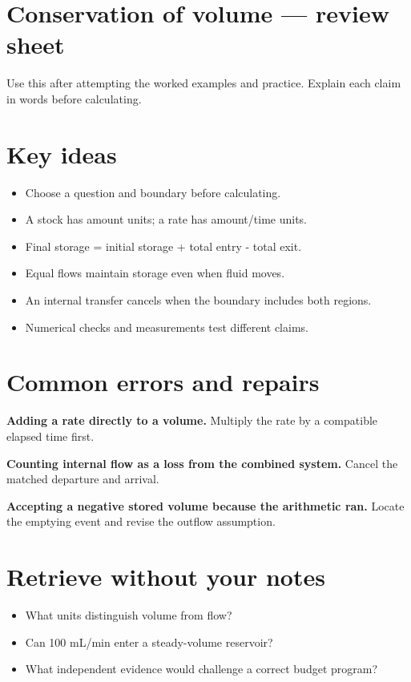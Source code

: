 \documentclass[11pt,letterpaper]{article}
\theoremstyle{definition}\newtheorem{definition}{Definition}\newtheorem{example}{Example}
\numberwithin{equation}{section}
\begin{document}
\section*{Conservation of volume --- review sheet}
Use this after attempting the worked examples and practice. Explain each claim in words before calculating.

\section*{Key ideas}
\begin{itemize}
\item Choose a question and boundary before calculating.
\item A stock has amount units; a rate has amount/time units.
\item Final storage =\allowbreak{} initial storage +\allowbreak{} total entry - total exit.
\item Equal flows maintain storage even when fluid moves.
\item An internal transfer cancels when the boundary includes both regions.
\item Numerical checks and measurements test different claims.
\end{itemize}
\section*{Common errors and repairs}
\textbf{Adding a rate directly to a volume.} Multiply the rate by a compatible elapsed time first.

\textbf{Counting internal flow as a loss from the combined system.} Cancel the matched departure and arrival.

\textbf{Accepting a negative stored volume because the arithmetic ran.} Locate the emptying event and revise the outflow assumption.

\section*{Retrieve without your notes}
\begin{itemize}
\item What units distinguish volume from flow?
\item Can 100 mL/min enter a steady-volume reservoir?
\item What independent evidence would challenge a correct budget program?
\end{itemize}
\end{document}
